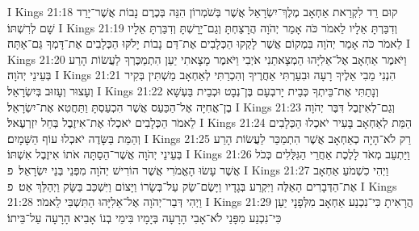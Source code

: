 I Kings 21:18	קוּם רֵד לִקְרַאת אַחְאָב מֶלֶךְ־יִשְׂרָאֵל אֲשֶׁר בְּשֹׁמְרוֹן הִנֵּה בְּכֶרֶם נָבוֹת אֲשֶׁר־יָרַד שָׁם לְרִשְׁתּוֹ׃
I Kings 21:19	וְדִבַּרְתָּ אֵלָיו לֵאמֹר כֹּה אָמַר יְהֹוָה הֲרָצַחְתָּ וְגַם־יָרָשְׁתָּ וְדִבַּרְתָּ אֵלָיו לֵאמֹר כֹּה אָמַר יְהֹוָה בִּמְקוֹם אֲשֶׁר לָקְקוּ הַכְּלָבִים אֶת־דַּם נָבוֹת יָלֹקּוּ הַכְּלָבִים אֶת־דָּמְךָ גַּם־אָתָּה׃
I Kings 21:20	וַיֹּאמֶר אַחְאָב אֶל־אֵלִיָּהוּ הַמְצָאתַנִי אֹיְבִי וַיֹּאמֶר מָצָאתִי יַעַן הִתְמַכֶּרְךָ לַעֲשׂוֹת הָרַע בְּעֵינֵי יְהֹוָה׃
I Kings 21:21	הִנְנִי מֵבִי אֵלֶיךָ רָעָה וּבִעַרְתִּי אַחֲרֶיךָ וְהִכְרַתִּי לְאַחְאָב מַשְׁתִּין בְּקִיר וְעָצוּר וְעָזוּב בְּיִשְׂרָאֵל׃
I Kings 21:22	וְנָתַתִּי אֶת־בֵּיתְךָ כְּבֵית יָרבְעָם בֶּן־נְבָט וּכְבֵית בַּעְשָׁא בֶן־אֲחִיָּה אֶל־הַכַּעַס אֲשֶׁר הִכְעַסְתָּ וַתַּחֲטִא אֶת־יִשְׂרָאֵל׃
I Kings 21:23	וְגַם־לְאִיזֶבֶל דִּבֶּר יְהֹוָה לֵאמֹר הַכְּלָבִים יֹאכְלוּ אֶת־אִיזֶבֶל בְּחֵל יִזְרְעֶאל׃
I Kings 21:24	הַמֵּת לְאַחְאָב בָּעִיר יֹאכְלוּ הַכְּלָבִים וְהַמֵּת בַּשָּׂדֶה יֹאכְלוּ עוֹף הַשָּׁמָיִם׃
I Kings 21:25	רַק לֹא־הָיָה כְאַחְאָב אֲשֶׁר הִתְמַכֵּר לַעֲשׂוֹת הָרַע בְּעֵינֵי יְהֹוָה אֲשֶׁר־הֵסַתָּה אֹתוֹ אִיזֶבֶל אִשְׁתּוֹ׃
I Kings 21:26	וַיַּתְעֵב מְאֹד לָלֶכֶת אַחֲרֵי הַגִּלֻּלִים כְּכֹל אֲשֶׁר עָשׂוּ הָאֱמֹרִי אֲשֶׁר הוֹרִישׁ יְהֹוָה מִפְּנֵי בְּנֵי יִשְׂרָאֵל׃ {פ}
I Kings 21:27	וַיְהִי כִשְׁמֹעַ אַחְאָב אֶת־הַדְּבָרִים הָאֵלֶּה וַיִּקְרַע בְּגָדָיו וַיָּשֶׂם־שַׂק עַל־בְּשָׂרוֹ וַיָּצוֹם וַיִּשְׁכַּב בַּשָּׂק וַיְהַלֵּךְ אַט׃ {פ}
I Kings 21:28	וַיְהִי דְּבַר־יְהֹוָה אֶל־אֵלִיָּהוּ הַתִּשְׁבִּי לֵאמֹר׃
I Kings 21:29	הֲרָאִיתָ כִּי־נִכְנַע אַחְאָב מִלְּפָנָי יַעַן כִּי־נִכְנַע מִפָּנַי לֹא־אָבִי הָרָעָה בְּיָמָיו בִּימֵי בְנוֹ אָבִיא הָרָעָה עַל־בֵּיתוֹ׃
